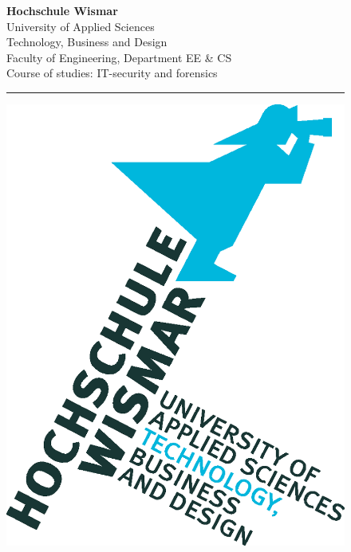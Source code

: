 \begin{titlepage}
	\setlength\headsep{-5mm}
	\begin{figure}[!h]
		\begin{minipage}{0.8\textwidth}
			\textbf{Hochschule Wismar} \\
			University of Applied Sciences \\
			Technology, Business and Design \\
			Faculty of Engineering, Department EE \&{} CS \\
			Course of studies: IT-security and forensics\\
		\rule{\textwidth}{0.5pt}
		\end{minipage}
		\begin{minipage}[r]{0.1\textwidth}
			\begin{flushright}
				\includegraphics[height=6\baselineskip]{pics/HS-Wismar_Logo-FIW_V1_4C.eps}
			\end{flushright}
		\end{minipage}

\end{figure}
\end{titlepage}
